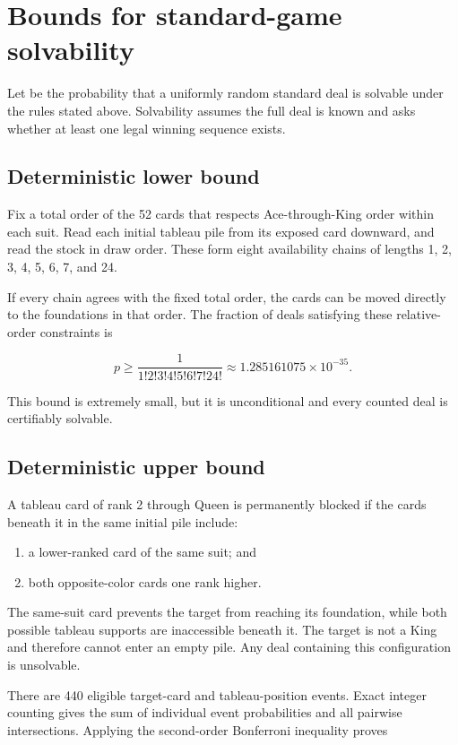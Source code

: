 \documentclass[11pt]{article}
\begin{document}
\section{Bounds for standard-game solvability}

Let \texttt{} be the probability that a uniformly random standard deal is solvable under the rules stated above. Solvability assumes the full deal is known and asks whether at least one legal winning sequence exists.

\subsection{Deterministic lower bound}

Fix a total order of the 52 cards that respects Ace-through-King order within each suit. Read each initial tableau pile from its exposed card downward, and read the stock in draw order. These form eight availability chains of lengths 1, 2, 3, 4, 5, 6, 7, and 24.

If every chain agrees with the fixed total order, the cards can be moved directly to the foundations in that order. The fraction of deals satisfying these relative-order constraints is

\[
p\ge \frac{1}{1!2!3!4!5!6!7!24!}
\approx 1.285161075\times 10^{-35}.
\]

This bound is extremely small, but it is unconditional and every counted deal is certifiably solvable.

\subsection{Deterministic upper bound}

A tableau card of rank 2 through Queen is permanently blocked if the cards beneath it in the same initial pile include:

\begin{enumerate}
  \item a lower-ranked card of the same suit; and
  \item both opposite-color cards one rank higher.
\end{enumerate}

The same-suit card prevents the target from reaching its foundation, while both possible tableau supports are inaccessible beneath it. The target is not a King and therefore cannot enter an empty pile. Any deal containing this configuration is unsolvable.

There are 440 eligible target-card and tableau-position events. Exact integer counting gives the sum of individual event probabilities and all pairwise intersections. Applying the second-order Bonferroni inequality proves
\end{document}
